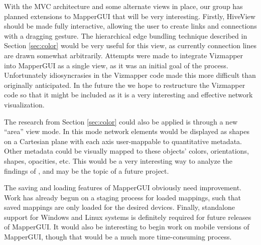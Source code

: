 With the MVC architecture and some alternate views in place, our group has planned extensions to MapperGUI that will be very interesting. Firstly, HiveView should be made fully interactive, allowing the user to create links and connections with a dragging gesture. The hierarchical edge bundling technique described in Section \ref{sec:color} would be very useful for this view, as currently connection lines are drawn somewhat arbitrarily. Attempts were made to integrate Vizmapper into MapperGUI as a single view, as it was an initial goal of the process. Unfortunately idiosyncrasies in the Vizmapper code made this more difficult than originally anticipated. In the future the we hope to restructure the Vizmapper code so that it might be included as it is a very interesting and effective network visualization. 

The research from Section \ref{sec:color} could also be applied is through a new ``area'' view mode. In this mode network elements would be displayed as shapes on a Cartesian plane with each axis user-mappable to quantitative metadata. Other metadata could be visually mapped to these objects' colors, orientations, shapes, opacities, etc. This would be a very interesting way to analyze the findings of , and may be the topic of a future project. 

The saving and loading features of MapperGUI obviously need improvement. Work has already begun on a staging process for loaded mappings, such that saved mappings are only loaded for the desired devices. Finally, standalone support for Windows and Linux systems is definitely required for future releases of MapperGUI. It would also be interesting to begin work on mobile versions of MapperGUI, though that would be a much more time-consuming process. 



	